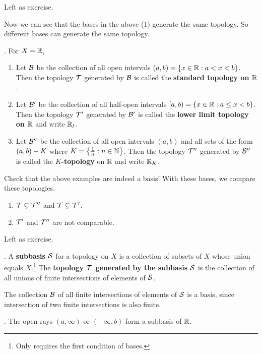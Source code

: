 \pf Left as exercise.

Now we can see that the bases in the above  (1) generate the same topology. So different bases can generate the same topology.

\ex. For \(X = \mathbb{R}\),
\begin{enumerate}
    \item Let \(\mathcal{B}\) be the collection of all open intervals \((a, b) = \{x \in \mathbb{R} : a < x < b\}\). Then the topology \(\mathcal{T}\) generated by \(\mathcal{B}\) is called the \textbf{standard topology on \(\mathbb{R}\)}.
    \item Let \(\mathcal{B}'\) be the collection of all half-open intervals \([a, b) = \{x \in \mathbb{R} : a \leq x < b\}\). Then the topology \(\mathcal{T}'\) generated by \(\mathcal{B}'\) is called the \textbf{lower limit topology on \(\mathbb{R}\)} and write \(\mathbb{R}_l\).
    \item Let \(\mathcal{B}''\) be the collection of all open intervals \((a, b)\) and all sets of the form \((a, b) - K\) where \(K = \left\{\frac{1}{n} : n \in \mathbb{N}\right\}\). Then the topology \(\mathcal{T}''\) generated by \(\mathcal{B''}\) is called the \textbf{\(K\)-topology} on \(\mathbb{R}\) and write \(\mathbb{R}_K\).
\end{enumerate}

Check that the above examples are indeed a basis! With these bases, we compare these topologies.

\begin{enumerate}
    \item \(\mathcal{T} \subsetneq \mathcal{T''}\) and \(\mathcal{T} \subsetneq \mathcal{T'}\).
    \item \(\mathcal{T'}\) and \(\mathcal{T''}\) are not comparable.
\end{enumerate}

\pf Left as exercise.

.  A \textbf{subbasis} \(\mathcal{S}\) for a topology on \(X\) is a collection of subsets of \(X\) whose union equals \(X\).\footnote{Only requires the first condition of bases.} The \textbf{topology \(\mathcal{T}\) generated by the subbasis \(\mathcal{S}\)} is the collection of all unions of finite intersections of elements of \(\mathcal{S}\).

The collection \(\mathcal{B}\) of all finite intersections of elements of \(\mathcal{S}\) is a basis, since intersection of two finite intersections is also finite.

\ex. The open rays \((a, \infty)\) or \((-\infty, b)\) form a subbasis of \(\mathbb{R}\).


